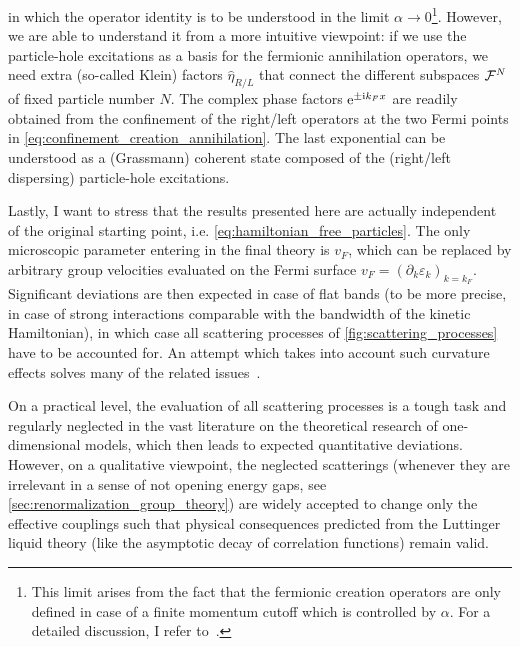 in which the operator identity is to be understood in the limit $\alpha\rightarrow0$\footnote{This limit arises from the fact that the fermionic creation operators are only defined in case of a finite momentum cutoff which is controlled by $\alpha$. For a detailed discussion, I refer to~\cite{Bruus2004}.}.
However, we are able to understand it from a more intuitive viewpoint: if we use the particle-hole excitations as a basis for the fermionic annihilation operators, we need extra (so-called Klein) factors $\hat \eta_{R/L}$ that connect the different subspaces $\mathcal{F}^N$ of fixed particle number $N$.
The complex phase factors $\mathrm e^{\pm\mathrm i k_Fx}$ are readily obtained from the confinement of the right/left operators at the two Fermi points in \cref{eq:confinement_creation_annihilation}.
The last exponential can be understood as a (Grassmann) coherent state composed of the (right/left dispersing) particle-hole excitations.

Lastly, I want to stress that the results presented here are actually independent of the original starting point, i.e. \cref{eq:hamiltonian_free_particles}.
The only microscopic parameter entering in the final theory is $v_F$, which can be replaced by arbitrary group velocities evaluated on the Fermi surface $v_F=(\partial_k\varepsilon_k)_{k=k_F}$.
Significant deviations are then expected in case of flat bands (to be more precise, in case of strong interactions comparable with the bandwidth of the kinetic Hamiltonian), in which case all scattering processes of \cref{fig:scattering_processes} have to be accounted for.
An attempt which takes into account such curvature effects solves many of the related issues~\cite{Imambekov2009}.

On a practical level, the evaluation of all scattering processes is a tough task and regularly neglected in the vast literature on the theoretical research of one-dimensional models, which then leads to expected quantitative deviations.
However, on a qualitative viewpoint, the neglected scatterings (whenever they are irrelevant in a sense of not opening energy gaps, see \cref{sec:renormalization_group_theory}) are widely accepted to change only the effective couplings such that physical consequences predicted from the Luttinger liquid theory (like the asymptotic decay of correlation functions) remain valid.
%
%
